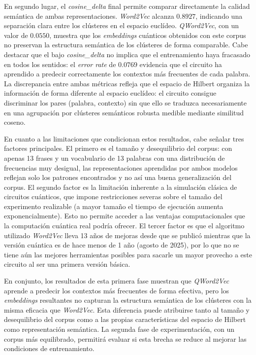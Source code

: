 En segundo lugar, el \textit{cosine\_delta} final permite comparar directamente la calidad semántica de ambas representaciones. \textit{Word2Vec} alcanza $0.8927$, indicando una separación clara entre los clústeres en el espacio euclídeo. \textit{QWord2Vec}, con un valor de $0.0550$, muestra que los \textit{embeddings} cuánticos obtenidos con este corpus no preservan la estructura semántica de los clústeres de forma comparable. Cabe destacar que el bajo \textit{cosine\_delta} no implica que el entrenamiento haya fracasado en todos los sentidos: el \textit{error rate} de $0.0769$ evidencia que el circuito ha aprendido a predecir correctamente los contextos más frecuentes de cada palabra. La discrepancia entre ambas métricas refleja que el espacio de Hilbert organiza la información de forma diferente al espacio euclídeo: el circuito consigue discriminar los pares (palabra, contexto) sin que ello se traduzca necesariamente en una agrupación por clústeres semánticos robusta medible mediante similitud coseno.

En cuanto a las limitaciones que condicionan estos resultados, cabe señalar tres factores principales. El primero es el tamaño y desequilibrio del corpus: con apenas 13 frases y un vocabulario de 13 palabras con una distribución de frecuencias muy desigual, las representaciones aprendidas por ambos modelos reflejan solo los patrones encontrados y no así una buena generalización del corpus. El segundo factor es la limitación inherente a la simulación clásica de circuitos cuánticos, que impone restricciones severas sobre el tamaño del experimento realizable (a mayor tamaño el tiempo de ejecución aumenta exponencialmente). Esto no permite acceder a las ventajas computacionales que la computación cuántica real podría ofrecer. El tercer factor es que el algoritmo utilizado \textit{Word2Vec} lleva 13 años de mejoras desde que se publicó mientras que la versión cuántica es de hace menos de 1 año (agosto de 2025), por lo que no se tiene aún las mejores herramientas posibles para sacarle un mayor provecho a este circuito al ser una primera versión básica.

En conjunto, los resultados de esta primera fase muestran que \textit{QWord2Vec} aprende a predecir los contextos más frecuentes de forma efectiva, pero los \textit{embeddings} resultantes no capturan la estructura semántica de los clústeres con la misma eficacia que \textit{Word2Vec}. Esta diferencia puede atribuirse tanto al tamaño y desequilibrio del corpus como a las propias características del espacio de Hilbert como representación semántica. La segunda fase de experimentación, con un corpus más equilibrado, permitirá evaluar si esta brecha se reduce al mejorar las condiciones de entrenamiento.


